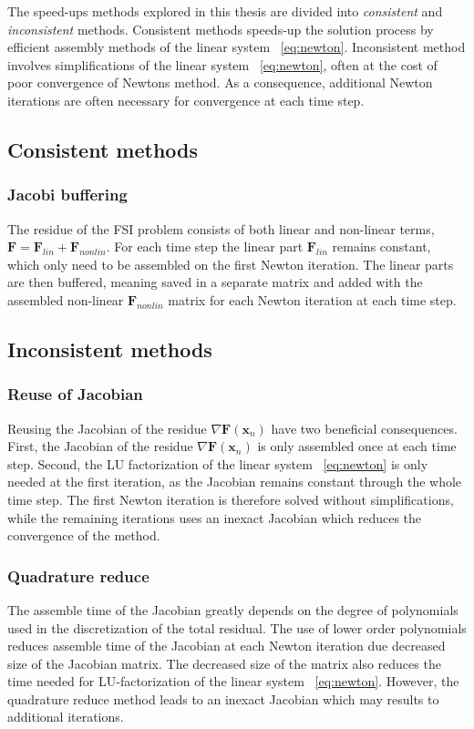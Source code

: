The speed-ups methods explored in this thesis are divided into \textit{consistent} and \textit{inconsistent} methods. 
Consistent methods speeds-up the solution process by efficient assembly methods of the linear system ~\ref{eq:newton}. Inconsistent method involves simplifications of the linear system ~\ref{eq:newton}, often at the cost of poor convergence of Newtons method. As a consequence, additional Newton iterations are often necessary for convergence at each time step. 
\newpage
\subsection{Consistent methods}
\subsubsection{Jacobi buffering}
The residue of the FSI problem consists of both linear and non-linear terms, $\mathbf{F} = \mathbf{F}_{lin} + \mathbf{F}_{nonlin}$. For each time step the linear part $\mathbf{F}_{lin}$ remains constant, which only need to be assembled on the first Newton iteration.  The linear parts are then buffered, meaning saved in a separate matrix and added with the assembled non-linear $\mathbf{F}_{nonlin}$ matrix for each Newton iteration at each time step. 
\subsection{Inconsistent methods}    
\subsubsection{Reuse of Jacobian}
Reusing the Jacobian of the residue $\nabla \mathbf{F}(\mathbf{x}_n)$ have two beneficial consequences. First, the 
Jacobian of the residue $\nabla \mathbf{F}(\mathbf{x}_n)$ is only assembled once at each time step. Second, the
LU factorization of the linear system ~\ref{eq:newton} is only needed at the first iteration, as the Jacobian remains constant through the whole time step. The first Newton iteration is therefore solved without simplifications, while the remaining iterations uses an inexact Jacobian which reduces the convergence of the method.
\subsubsection{Quadrature reduce}
The assemble time of the Jacobian greatly depends on the degree of polynomials used in the discretization of the total residual. The use of lower order polynomials reduces assemble time of the Jacobian at each Newton iteration due decreased size of the Jacobian matrix. The decreased size of the matrix also reduces the time needed for LU-factorization of the linear system ~\ref{eq:newton}. However, the quadrature reduce method leads to an inexact Jacobian which may results to additional iterations. 
